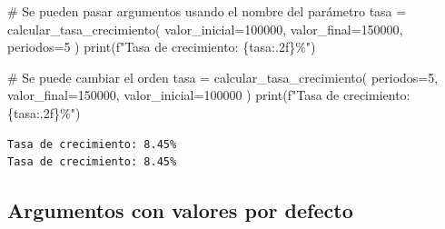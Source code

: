 \documentclass[
  doc,
  floatsintext,
  longtable,
  a4paper,
  nolmodern,
  notxfonts,
  notimes,
  12pt,
  colorlinks=true,linkcolor=blue,citecolor=blue,urlcolor=blue]{apa7}
\newenvironment{Shaded}{\begin{snugshade}}{\end{snugshade}}
\newcommand{\BuiltInTok}[1]{\textcolor[rgb]{0.00,0.23,0.31}{#1}}
\newcommand{\CommentTok}[1]{\textcolor[rgb]{0.37,0.37,0.37}{#1}}
\newcommand{\DecValTok}[1]{\textcolor[rgb]{0.68,0.00,0.00}{#1}}
\newcommand{\NormalTok}[1]{\textcolor[rgb]{0.00,0.23,0.31}{#1}}
\newcommand{\OperatorTok}[1]{\textcolor[rgb]{0.37,0.37,0.37}{#1}}
\newcommand{\SpecialCharTok}[1]{\textcolor[rgb]{0.37,0.37,0.37}{#1}}
\newcommand{\SpecialStringTok}[1]{\textcolor[rgb]{0.13,0.47,0.30}{#1}}
\begin{document}
\begin{Shaded}
\begin{Highlighting}[]
\CommentTok{\# Se pueden pasar argumentos usando el nombre del parámetro}
\NormalTok{tasa }\OperatorTok{=}\NormalTok{ calcular\_tasa\_crecimiento(}
\NormalTok{    valor\_inicial}\OperatorTok{=}\DecValTok{100000}\NormalTok{,}
\NormalTok{    valor\_final}\OperatorTok{=}\DecValTok{150000}\NormalTok{,}
\NormalTok{    periodos}\OperatorTok{=}\DecValTok{5}
\NormalTok{)}
\BuiltInTok{print}\NormalTok{(}\SpecialStringTok{f"Tasa de crecimiento: }\SpecialCharTok{\{}\NormalTok{tasa}\SpecialCharTok{:.2f\}}\SpecialStringTok{\%"}\NormalTok{)}

\CommentTok{\# Se puede cambiar el orden}
\NormalTok{tasa }\OperatorTok{=}\NormalTok{ calcular\_tasa\_crecimiento(}
\NormalTok{    periodos}\OperatorTok{=}\DecValTok{5}\NormalTok{,}
\NormalTok{    valor\_final}\OperatorTok{=}\DecValTok{150000}\NormalTok{,}
\NormalTok{    valor\_inicial}\OperatorTok{=}\DecValTok{100000}
\NormalTok{)}
\BuiltInTok{print}\NormalTok{(}\SpecialStringTok{f"Tasa de crecimiento: }\SpecialCharTok{\{}\NormalTok{tasa}\SpecialCharTok{:.2f\}}\SpecialStringTok{\%"}\NormalTok{)}
\end{Highlighting}
\end{Shaded}

\begin{verbatim}
Tasa de crecimiento: 8.45%
Tasa de crecimiento: 8.45%
\end{verbatim}

\subsection{Argumentos con valores por
defecto}\label{argumentos-con-valores-por-defecto}
\end{document}
